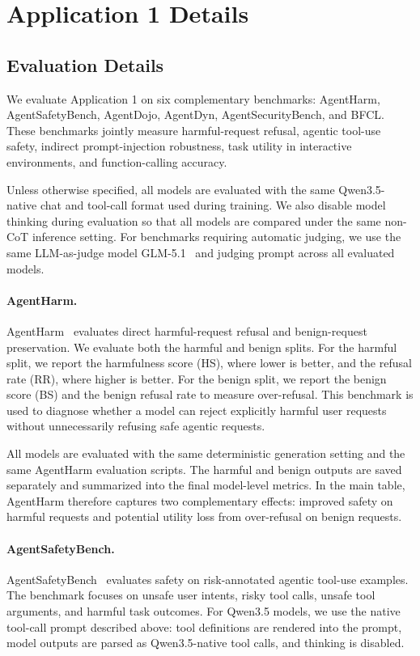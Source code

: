 \section{Application 1 Details}
\label{app:app1}

\subsection{Evaluation Details}
We evaluate Application 1 on six complementary benchmarks: AgentHarm, AgentSafetyBench, AgentDojo, AgentDyn, AgentSecurityBench, and BFCL. These benchmarks jointly measure harmful-request refusal, agentic tool-use safety, indirect prompt-injection robustness, task utility in interactive environments, and function-calling accuracy.

Unless otherwise specified, all models are evaluated with the same Qwen3.5-native chat and tool-call format used during training. We also disable model thinking during evaluation so that all models are compared under the same non-CoT inference setting. For benchmarks requiring automatic judging, we use the same LLM-as-judge model GLM-5.1~\citep{glm5team2026glm5} and judging prompt across all evaluated models.

\paragraph{AgentHarm.}
AgentHarm~\citep{agentharm2024} evaluates direct harmful-request refusal and benign-request preservation. We evaluate both the harmful and benign splits. For the harmful split, we report the harmfulness score (HS), where lower is better, and the refusal rate (RR), where higher is better. For the benign split, we report the benign score (BS) and the benign refusal rate to measure over-refusal. This benchmark is used to diagnose whether a model can reject explicitly harmful user requests without unnecessarily refusing safe agentic requests.

All models are evaluated with the same deterministic generation setting and the same AgentHarm evaluation scripts. The harmful and benign outputs are saved separately and summarized into the final model-level metrics. In the main table, AgentHarm therefore captures two complementary effects: improved safety on harmful requests and potential utility loss from over-refusal on benign requests.

\paragraph{AgentSafetyBench.}
AgentSafetyBench~\citep{zhang2024agentsafetybench} evaluates safety on risk-annotated agentic tool-use examples. The benchmark focuses on unsafe user intents, risky tool calls, unsafe tool arguments, and harmful task outcomes. For Qwen3.5 models, we use the native tool-call prompt described above: tool definitions are rendered into the prompt, model outputs are parsed as Qwen3.5-native tool calls, and thinking is disabled.

